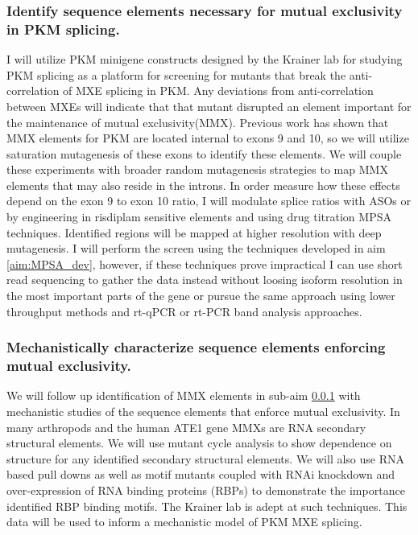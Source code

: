 \documentclass{article}
\begin{document}
\subsubsection{Identify sequence elements necessary for mutual exclusivity in PKM splicing.} \label{aim:PKM_motif_finding}
I will utilize PKM minigene constructs designed by the Krainer lab for studying PKM splicing \cite{Wang2012-dr} as a platform for screening for mutants that break the anti-correlation of MXE splicing in PKM.
Any deviations from anti-correlation between MXEs will indicate that that mutant disrupted an element important for the maintenance of mutual exclusivity(MMX).
Previous work has shown that MMX elements for PKM are located internal to exons 9 and 10,\cite{Wang2012-dr} so we will utilize saturation mutagenesis of these exons to identify these elements.
We will couple these experiments with broader random mutagenesis strategies to map MMX elements that may also reside in the introns.
In order measure how these effects depend on the exon 9 to exon 10 ratio, I will modulate splice ratios with ASOs\cite{Wang2012-ea,Ma2022-dt} or by engineering in risdiplam sensitive elements and using drug titration MPSA techniques\cite{Ishigami2022-bf}.
Identified regions will be mapped at higher resolution with deep mutagenesis.
I will perform the screen using the techniques developed in aim \ref{aim:MPSA_dev}, however, if these techniques prove impractical I can use short read sequencing to gather the data instead without loosing isoform resolution in the most important parts of the gene or pursue the same approach using lower throughput methods and rt-qPCR or rt-PCR band analysis approaches.
%
\subsubsection{Mechanistically characterize sequence elements enforcing mutual exclusivity.} \label{aim:PKM_mechanistic}
We will follow up identification of MMX elements in sub-aim \ref{aim:PKM_motif_finding} with mechanistic studies of the sequence elements that enforce mutual exclusivity. 
In many arthropods and the human ATE1 gene \cite{Graveley2005-oi, Jin2018-tq, Kalinina2021-jt} MMXs are RNA secondary structural elements. 
We will use mutant cycle analysis to show dependence on structure for any identified secondary structural elements. 
We will also use RNA based pull downs as well as motif mutants coupled with RNAi knockdown and over-expression of RNA binding proteins (RBPs) to demonstrate the importance identified RBP binding motifs. The Krainer lab is adept at such techniques.\cite{Wang2012-dr}
This data will be used to inform a mechanistic model of PKM MXE splicing.







\printbibliography
\end{document}
